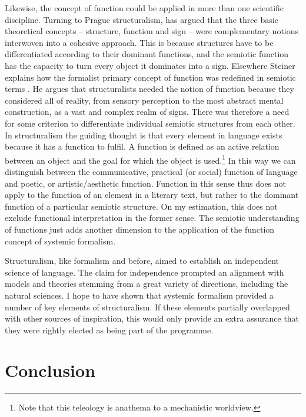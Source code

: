 \documentclass[output=paper]{langscibook}
\begin{document}
Likewise, the concept of function could be applied in more than one scientific discipline. Turning to Prague structuralism, \citet{Steiner1976} has argued that the three basic theoretical concepts -- structure, function and sign -- were complementary notions interwoven into a cohesive approach. This is because structures have to be differentiated according to their dominant functions, and the semiotic function has the capacity to turn every object it dominates into a sign. Elsewhere Steiner explains how the formalist primary concept of function was redefined in semiotic terms \citep[264--266]{Steiner1984}. He argues that structuralists needed the notion of function because they considered all of reality, from sensory perception to the most abstract mental construction, as a vast and complex realm of signs. There was therefore a need for some criterion to differentiate individual semiotic structures from each other. In structuralism the guiding thought is that every element in language exists because it has a function to fulfil. A function is defined as an active relation between an object and the goal for which the object is used.\footnote{Note that this teleology is anathema to a mechanistic worldview.} In this way we can distinguish between the communicative, practical (or social) function of language and poetic, or artistic/aesthetic function. Function in this sense thus does not apply to the function of an element in a literary text, but rather to the dominant function of a particular semiotic structure. On my estimation, this does not exclude functional interpretation in the former sense. The semiotic understanding of functions just adds another dimension to the application of the function concept of systemic formalism.

Structuralism, like formalism and {\Saussure} before, aimed to establish an independent science of language. The claim for independence prompted an alignment with models and theories stemming from a great variety of directions, including the natural sciences. I hope to have shown that systemic formalism provided a number of key elements of structuralism. If these elements partially overlapped with other sources of inspiration, this would only provide an extra assurance that they were rightly elected as being part of the  programme. 

\section{Conclusion}
\label{sec:karstens:conclusion}
\end{document}
